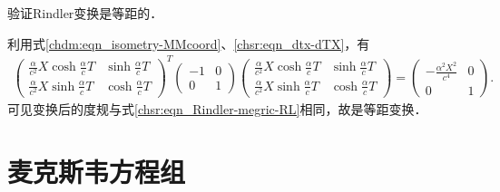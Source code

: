 \begin{example}
	验证Rindler变换是等距的．
\end{example}
利用式\eqref{chdm:eqn_isometry-MMcoord}、\eqref{chsr:eqn_dtx-dTX}，有
\setlength{\mathindent}{0em}
\begin{align*}
	\begin{pmatrix}
		\frac{\alpha}{c^2} X\cosh \frac{\alpha}{c}T & \sinh\frac{\alpha}{c} T \\ 
		\frac{\alpha}{c^2} X\sinh \frac{\alpha}{c}T & \cosh\frac{\alpha}{c} T
	\end{pmatrix}^T
	\begin{pmatrix}
		-1 & 0 \\ 0 & 1
	\end{pmatrix}
	\begin{pmatrix}
		\frac{\alpha}{c^2} X\cosh \frac{\alpha}{c}T & \sinh\frac{\alpha}{c} T \\ 
		\frac{\alpha}{c^2} X\sinh \frac{\alpha}{c}T & \cosh\frac{\alpha}{c} T
	\end{pmatrix} 
	=\begin{pmatrix}
		-\frac{\alpha ^2 X^2}{c^4} & 0 \\ 
		0 & 1
	\end{pmatrix} .
\end{align*}\setlength{\mathindent}{2em}
可见变换后的度规与式\eqref{chsr:eqn_Rindler-megric-RL}相同，故是等距变换．




\section{麦克斯韦方程组}\label{chsr:sec_maxwell}

